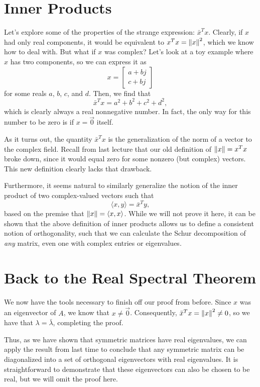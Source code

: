 \documentclass[letterpaper]{article}
\theoremstyle{remark}
\newcommand{\mat}[1]{\ensuremath{\begin{bmatrix}#1\end{bmatrix}}}
\begin{document}
\section{Inner Products}
Let's explore some of the properties of the strange expression: $\bar{x}^Tx$. Clearly, if $x$ had only real components, it would be equivalent to $x^Tx = \norm{x}^2$, which we know how to deal with. But what if $x$ was complex? Let's look at a toy example where $x$ has two components, so we can express it as
\[
    x = \mat{a + bj \\ c + bj}
\]
for some reals $a$, $b$, $c$, and $d$. Then, we find that
\[
    \bar{x}^Tx = a^2 + b^2 + c^2 + d^2,
\]
which is clearly always a real nonnegative number. In fact, the only way for this number to be zero is if $x = \vec{0}$ itself.

As it turns out, the quantity $\bar{x}^Tx$ is the generalization of the norm of a vector to the complex field. Recall from last lecture that our old definition of $\norm{x} = x^Tx$ broke down, since it would equal zero for some nonzero (but complex) vectors. This new definition clearly lacks that drawback.

Furthermore, it seems natural to similarly generalize the notion of the inner product of two complex-valued vectors such that
\[
    \langle x, y \rangle = \bar{x}^Ty,
\]
based on the premise that $\norm{x} = \langle x, x \rangle$. While we will not prove it here, it can be shown that the above definition of inner products allows us to define a consistent notion of orthogonality, such that we can calculate the Schur decomposition of \emph{any} matrix, even one with complex entries or eigenvalues.

\section{Back to the Real Spectral Theorem}
We now have the tools necessary to finish off our proof from before. Since $x$ was an eigenvector of $A$, we know that $x \ne \vec{0}$. Consequently, $\bar{x}^Tx = \norm{x}^2 \ne 0$, so we have that $\lambda = \bar{\lambda}$, completing the proof.

Thus, as we have shown that symmetric matrices have real eigenvalues, we can apply the result from last time to conclude that any symmetric matrix can be diagonalized into a set of orthogonal eigenvectors with real eigenvalues. It is straightforward to demonstrate that these eigenvectors can also be chosen to be real, but we will omit the proof here.
\end{document}
